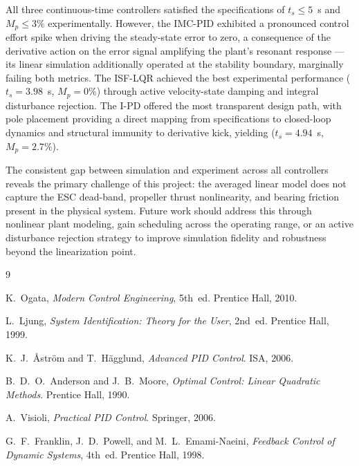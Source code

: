 \documentclass[conference]{IEEEtran}
\begin{document}
All three continuous-time controllers satisfied the specifications of $t_s \leq 5$~s and $M_p \leq 3\%$ experimentally. However, the IMC-PID exhibited a pronounced control effort spike when driving the steady-state error to zero, a consequence of the derivative action on the error signal amplifying the plant's resonant response — its linear simulation additionally operated at the stability boundary, marginally failing both metrics. The ISF-LQR achieved the best experimental performance ($t_s = 3.98$~s, $M_p = 0\%$) through active velocity-state damping and integral disturbance rejection. The I-PD offered the most transparent design path, with pole placement providing a direct mapping from specifications to closed-loop dynamics and structural immunity to derivative kick, yielding ($t_s = 4.94$~s, $M_p = 2.7\%$).

The consistent gap between simulation and experiment across all controllers reveals the primary challenge of this project: the averaged linear model does not capture
the ESC dead-band, propeller thrust nonlinearity, and bearing friction present in the physical system. Future work should address this through nonlinear plant modeling, gain scheduling across the operating range, or an active disturbance rejection strategy to improve simulation fidelity and robustness beyond the linearization point.

\begin{thebibliography}{9}

K.~Ogata, \textit{Modern Control Engineering}, 5th~ed.
Prentice Hall, 2010.

L.~Ljung, \textit{System Identification: Theory for the User}, 2nd~ed.
Prentice Hall, 1999.

K.~J.~Åström and T.~Hägglund, \textit{Advanced PID Control}.
ISA, 2006.

B.~D.~O.~Anderson and J.~B.~Moore, \textit{Optimal Control: Linear
Quadratic Methods}.
Prentice Hall, 1990.

A.~Visioli, \textit{Practical PID Control}.
Springer, 2006.

G.~F.~Franklin, J.~D.~Powell, and M.~L.~Emami-Naeini,
\textit{Feedback Control of Dynamic Systems}, 4th~ed.
Prentice Hall, 1998.

\end{thebibliography}

\end{document}

